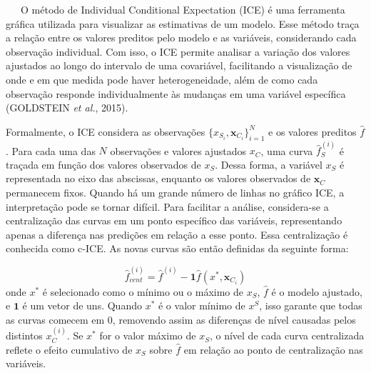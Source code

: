 \documentclass[
  12pt,
  a4paper,
]{scrreprt}
\begin{document}
~~~O método de Individual Conditional Expectation (ICE) é uma ferramenta
gráfica utilizada para visualizar as estimativas de um modelo. Esse
método traça a relação entre os valores preditos pelo modelo e as
variáveis, considerando cada observação individual. Com isso, o ICE
permite analisar a variação dos valores ajustados ao longo do intervalo
de uma covariável, facilitando a visualização de onde e em que medida
pode haver heterogeneidade, além de como cada observação responde
individualmente às mudanças em uma variável específica (GOLDSTEIN
\emph{et al.}, 2015).

\vspace{12pt}

Formalmente, o ICE considera as observações
\(\{x_{S_i}, \mathbf{x}_{C_i}\}_{i=1}^{N}\)\hspace{0pt} e os valores
preditos \(\hat f\)\hspace{0pt}. Para cada uma das \(N\) observações e
valores ajustados \(x_C\), uma curva
\(\hat f_S^{\left(i\right)}\)\hspace{0pt} é traçada em função dos
valores observados de \(x_S\). Dessa forma, a variável \(x_S\) é
representada no eixo das abscissas, enquanto os valores observados de
\(\mathbf x_C\)\hspace{0pt} permanecem fixos. Quando há um grande número
de linhas no gráfico ICE, a interpretação pode se tornar difícil. Para
facilitar a análise, considera-se a centralização das curvas em um ponto
específico das variáveis, representando apenas a diferença nas predições
em relação a esse ponto. Essa centralização é conhecida como c-ICE. As
novas curvas são então definidas da seguinte forma:

\[
\hat{f}_{cent}^{\left(i\right)} = \hat{f}^{\left(i\right)} - \mathbf{1} \hat{f}\left(x^*, \mathbf x_{C_i}\right)
\] onde \(x^*\) é selecionado como o mínimo ou o máximo de
\(x_S\)\hspace{0pt}, \(\hat f\)\hspace{0pt} é o modelo ajustado, e
\(\mathbf 1\) é um vetor de uns. Quando \(x^*\) é o valor mínimo de
\(x^S\)\hspace{0pt}, isso garante que todas as curvas comecem em 0,
removendo assim as diferenças de nível causadas pelos distintos
\(x_C^{\left(i\right)}\). Se \(x^*\) for o valor máximo de
\(x_S\)\hspace{0pt}, o nível de cada curva centralizada reflete o efeito
cumulativo de \(x_S\)\hspace{0pt} sobre \(\hat f\)\hspace{0pt} em
relação ao ponto de centralização nas variáveis.
\end{document}
